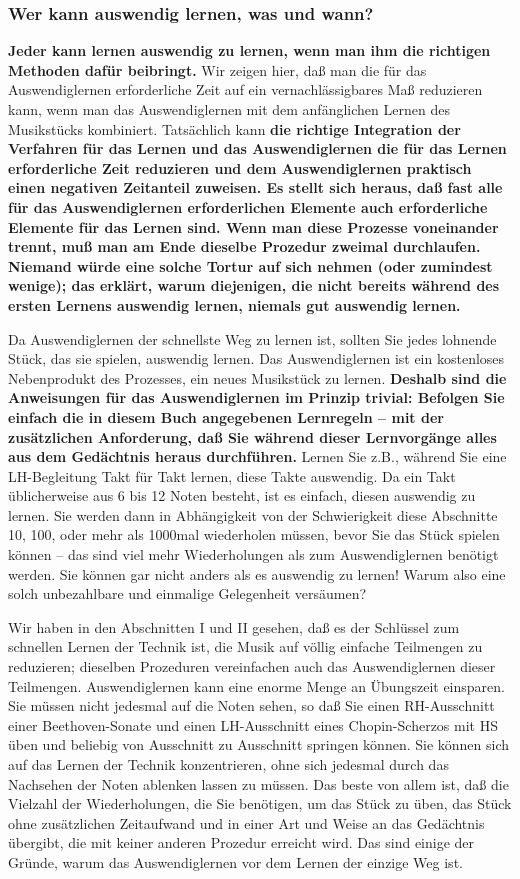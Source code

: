\subsubsection{Wer kann auswendig lernen, was und wann?}
\label{c1iii6b}

\textbf{Jeder kann lernen auswendig zu lernen, wenn man ihm die richtigen Methoden dafür beibringt.}
Wir zeigen hier, daß man die für das Auswendiglernen erforderliche Zeit auf ein vernachlässigbares Maß reduzieren kann, wenn man das Auswendiglernen mit dem anfänglichen Lernen des Musikstücks kombiniert.
Tatsächlich kann \textbf{die richtige Integration der Verfahren für das Lernen und das Auswendiglernen die für das Lernen erforderliche Zeit reduzieren und dem Auswendiglernen praktisch einen negativen Zeitanteil zuweisen.
Es stellt sich heraus, daß fast alle für das Auswendiglernen erforderlichen Elemente auch erforderliche Elemente für das Lernen sind.
Wenn man diese Prozesse voneinander trennt, muß man am Ende dieselbe Prozedur zweimal durchlaufen.
Niemand würde eine solche Tortur auf sich nehmen (oder zumindest wenige); das erklärt, warum diejenigen, die nicht bereits während des ersten Lernens auswendig lernen, niemals gut auswendig lernen.}

Da Auswendiglernen der schnellste Weg zu lernen ist, sollten Sie jedes lohnende Stück, das sie spielen, auswendig lernen.
Das Auswendiglernen ist ein kostenloses Nebenprodukt des Prozesses, ein neues Musikstück zu lernen.
\textbf{Deshalb sind die Anweisungen für das Auswendiglernen im Prinzip trivial: Befolgen Sie einfach die in diesem Buch angegebenen Lernregeln -- mit der zusätzlichen Anforderung, daß Sie während dieser Lernvorgänge alles aus dem Gedächtnis heraus durchführen.}
Lernen Sie z.B., während Sie eine LH-Begleitung Takt für Takt lernen, diese Takte auswendig.
Da ein Takt üblicherweise aus 6 bis 12 Noten besteht, ist es einfach, diesen auswendig zu lernen.
Sie werden dann in Abhängigkeit von der Schwierigkeit diese Abschnitte 10, 100, oder mehr als 1000mal wiederholen müssen, bevor Sie das Stück spielen können -- das sind viel mehr Wiederholungen als zum Auswendiglernen benötigt werden.
Sie können gar nicht anders als es auswendig zu lernen!
Warum also eine solch unbezahlbare und einmalige Gelegenheit versäumen?

Wir haben in den Abschnitten I und II gesehen, daß es der Schlüssel zum schnellen Lernen der Technik ist, die Musik auf völlig einfache Teilmengen zu reduzieren; dieselben Prozeduren vereinfachen auch das Auswendiglernen dieser Teilmengen.
Auswendiglernen kann eine enorme Menge an Übungszeit einsparen.
Sie müssen nicht jedesmal auf die Noten sehen, so daß Sie einen RH-Ausschnitt einer Beethoven-Sonate und einen LH-Ausschnitt eines Chopin-Scherzos mit HS üben und beliebig von Ausschnitt zu Ausschnitt springen können.
Sie können sich auf das Lernen der Technik konzentrieren, ohne sich jedesmal durch das Nachsehen der Noten ablenken lassen zu müssen.
Das beste von allem ist, daß die Vielzahl der Wiederholungen, die Sie benötigen, um das Stück zu üben, das Stück ohne zusätzlichen Zeitaufwand und in einer Art und Weise an das Gedächtnis übergibt, die mit keiner anderen Prozedur erreicht wird.
Das sind einige der Gründe, warum das Auswendiglernen vor dem Lernen der einzige Weg ist.

